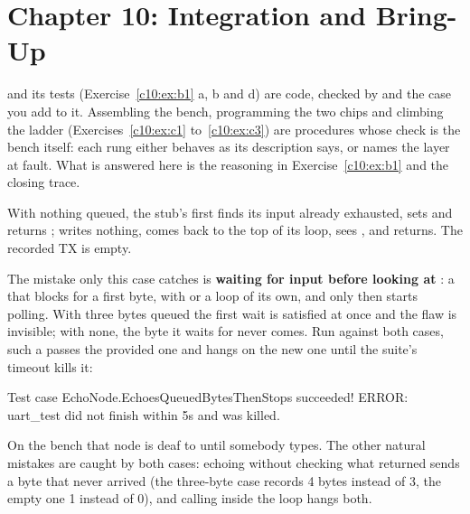 
\section{Chapter 10: Integration and Bring-Up}
\label{sol:c10}
 and its tests (Exercise~\ref{c10:ex:b1} a, b and d) are code, checked by
 and the case you add to it. Assembling the bench, programming
the two chips and climbing the ladder (Exercises~\ref{c10:ex:c1} to~\ref{c10:ex:c3}) are procedures
whose check is the bench itself: each rung either behaves as its description says, or names the
layer at fault. What is answered here is the reasoning in Exercise~\ref{c10:ex:b1} and the closing
trace.

 With nothing queued, the stub's first  finds its input already exhausted, sets
 and returns ;  writes nothing, comes back to the top of its loop,
sees , and returns. The recorded TX is empty.

The mistake only this case catches is \textbf{waiting for input before looking at }: a
 that blocks for a first byte, with  or a loop of its own, and only
then starts polling. With three bytes queued the first wait is satisfied at once and the flaw is
invisible; with none, the byte it waits for never comes. Run against both cases, such a
 passes the provided one and hangs on the new one until the suite's timeout kills it:

\begin{console}
Test case EchoNode.EchoesQueuedBytesThenStops succeeded!
ERROR: uart_test did not finish within 5s and was killed.
\end{console}

\noindent On the bench that node is deaf to  until somebody types. The other natural
mistakes are caught by both cases: echoing without checking what  returned sends a byte
that never arrived (the three-byte case records 4 bytes instead of 3, the empty one 1 instead of 0),
and calling  inside the loop hangs both.

